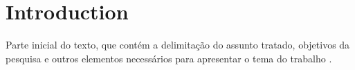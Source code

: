 
\chapter[Introduction]{Introduction}
\label{Introduction}


Parte inicial do texto, que contém a delimitação do assunto tratado, objetivos da pesquisa e outros elementos necessários para apresentar o tema do trabalho \cite{aguia2020}.



	
